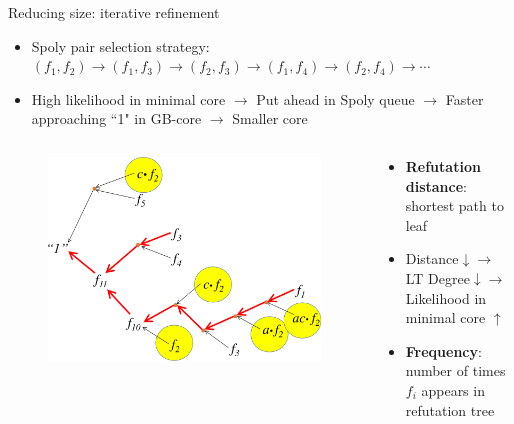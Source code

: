 \documentclass[xcolor=dvipsnames]{beamer}
\newcommand{\bi}{\begin{itemize}}
\newcommand{\ei}{\end{itemize}}
\begin{document}
\begin{frame}{\large{Reducing size: iterative refinement}}
\bi
\item Spoly pair selection strategy: $(f_1,f_2)\to(f_1,f_3)\to(f_2,f_3)\to(f_1,f_4)\to(f_2,f_4)\to\cdots$
\item High likelihood in minimal core $\to$ Put ahead in Spoly queue $\to$ Faster approaching ``1" in GB-core $\to$ Smaller core
\ei
\vspace{-0.2in}
\begin{columns}[onlytextwidth]
\begin{column}{0.5\textwidth}
\begin{figure}
\centering
\includegraphics[scale=0.25]{refutation_2.pdf}
\end{figure}
\end{column}
\begin{column}{0.5\textwidth}
\bi
\item {\bf Refutation distance}: shortest path to leaf
\item Distance$\downarrow \to$ LT Degree$\downarrow \to$ Likelihood in minimal core $\uparrow$
\vspace{0.2in}
\item {\bf Frequency}: number of times $f_i$ appears in refutation tree
\ei
\end{column}
\end{columns}
\end{frame}

\end{document}
